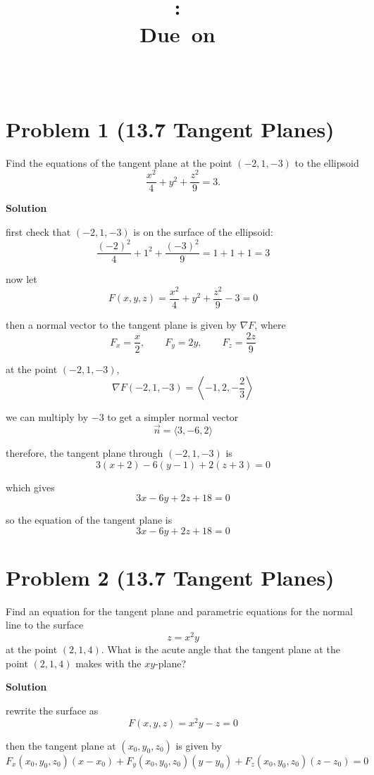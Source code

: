 \documentclass{article}
\title{
    \vspace{2in}
    \textmd{\textbf{\hmwkClass:\ \hmwkTitle}}\\
    \normalsize\vspace{0.1in}\small{Due\ on\ \hmwkDueDate}\\
    \vspace{0.1in}\large{\textit{\hmwkClassInstructor\ \hmwkClassTime}}
    \vspace{3in}
}
\author{\hmwkAuthorName}
\date{}
\newcommand{\solution}{\textbf{\large Solution}}
\theoremstyle{remark}
\begin{document}
\maketitle
\newpage

\section*{Problem 1 (13.7 Tangent Planes)}
Find the equations of the tangent plane at the point $(-2, 1, -3)$ to the ellipsoid
\[
    \frac{x^2}{4} + y^2 + \frac{z^2}{9} = 3.
\]

\medskip
\solution

first check that $(-2,1,-3)$ is on the surface of the ellipsoid:
\[
    \frac{(-2)^2}{4} + 1^2 + \frac{(-3)^2}{9} = 1 + 1 + 1 = 3
\]

now let
\[
    F(x,y,z) = \frac{x^2}{4} + y^2 + \frac{z^2}{9} - 3 = 0
\]

then a normal vector to the tangent plane is given by $\nabla F$, where
\[
    F_x = \frac{x}{2}, \qquad F_y = 2y, \qquad F_z = \frac{2z}{9}
\]

at the point $(-2,1,-3)$,
\[
    \nabla F(-2,1,-3) = \left\langle -1, 2, -\frac{2}{3} \right\rangle
\]

we can multiply by $-3$ to get a simpler normal vector
\[
    \vec n = \langle 3, -6, 2 \rangle
\]

therefore, the tangent plane through $(-2,1,-3)$ is
\[
    3(x+2) - 6(y-1) + 2(z+3) = 0
\]

which gives
\[
    3x - 6y + 2z + 18 = 0
\]

so the equation of the tangent plane is
\[
    \boxed{3x - 6y + 2z + 18 = 0}
\]

\vspace{1em}
\hrulefill

\section*{Problem 2 (13.7 Tangent Planes)}
Find an equation for the tangent plane and parametric equations for the normal line to the surface
\[
    z = x^2y
\]
at the point $(2,1,4)$. What is the acute angle that the tangent plane at the point $(2,1,4)$ makes with the $xy$-plane?

\medskip
\solution

rewrite the surface as
\[
    F(x,y,z) = x^2y - z = 0
\]

then the tangent plane at $(x_0,y_0,z_0)$ is given by
\[
    F_x(x_0,y_0,z_0)(x-x_0) + F_y(x_0,y_0,z_0)(y-y_0) + F_z(x_0,y_0,z_0)(z-z_0) = 0
\]
\end{document}
